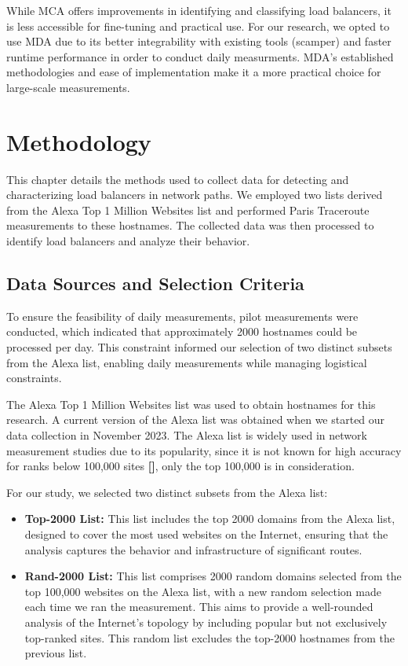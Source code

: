 \documentclass[12pt]{cwru_thesis}
\begin{document}
While MCA offers improvements in identifying and classifying load balancers, it is less accessible for fine-tuning and practical use. For our research, we opted to use MDA due to its better integrability with existing tools (scamper) and faster runtime performance in order to conduct daily measurments. MDA's established methodologies and ease of implementation make it a more practical choice for large-scale measurements. 
 

\chapter{Methodology}

This chapter details the methods used to collect data for detecting and characterizing load balancers in network paths. We employed two lists derived from the Alexa Top 1 Million Websites list and performed Paris Traceroute measurements to these hostnames. The collected data was then processed to identify load balancers and analyze their behavior.

\section{Data Sources and Selection Criteria}

To ensure the feasibility of daily measurements, pilot measurements were conducted, which indicated that approximately 2000 hostnames could be processed per day. This constraint informed our selection of two distinct subsets from the Alexa list, enabling daily measurements while managing logistical constraints.

The Alexa Top 1 Million Websites list was used to obtain hostnames for this research. A current version of the Alexa list was obtained when we started our data collection in November 2023. The Alexa list is widely used in network measurement studies due to its popularity, since it is not known for high accuracy for ranks below 100,000 sites \textbf{[\cite{alexa2023top1m}]}, only the top 100,000 is in consideration.

For our study, we selected two distinct subsets from the Alexa list:
\begin{itemize}
    \item \textbf{Top-2000 List:} This list includes the top 2000 domains from the Alexa list, designed to cover the most used websites on the Internet, ensuring that the analysis captures the behavior and infrastructure of significant routes.
    \item \textbf{Rand-2000 List:} This list comprises 2000 random domains selected from the top 100,000 websites on the Alexa list, with a new random selection made each time we ran the measurement. This aims to provide a well-rounded analysis of the Internet's topology by including popular but not exclusively top-ranked sites. This random list excludes the top-2000 hostnames from the previous list.
\end{itemize}
\end{document}
